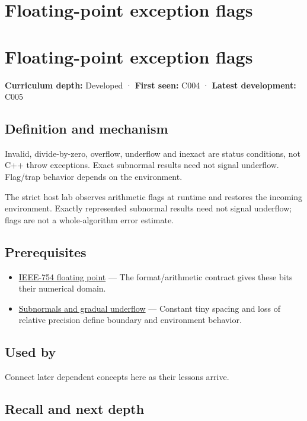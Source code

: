 \hypertarget{appendix-ed8531b46754}{}
\section*{Floating-point exception flags}
\section{Floating-point exception flags}\label{floating-point-exception-flags}

\textbf{Curriculum depth:} Developed · \textbf{First seen:} C004 · \textbf{Latest development:} C005

\subsection{Definition and mechanism}\label{definition-and-mechanism}

Invalid, divide-by-zero, overflow, underflow and inexact are status conditions, not C++ throw exceptions. Exact subnormal results need not signal underflow. Flag/trap behavior depends on the environment.

The strict host lab observes arithmetic flags at runtime and restores the incoming environment. Exactly represented subnormal results need not signal underflow; flags are not a whole-algorithm error estimate.

\subsection{Prerequisites}\label{prerequisites}

\begin{itemize}
\tightlist
\item
  \hyperref[appendix-343615f49ddf]{IEEE-754 floating point} --- The format/arithmetic contract gives these bits their numerical domain.
\item
  \hyperref[appendix-00a6e044c437]{Subnormals and gradual underflow} --- Constant tiny spacing and loss of relative precision define boundary and environment behavior.
\end{itemize}

\subsection{Used by}\label{used-by}

Connect later dependent concepts here as their lessons arrive.

\subsection{Recall and next depth}\label{recall-and-next-depth}

